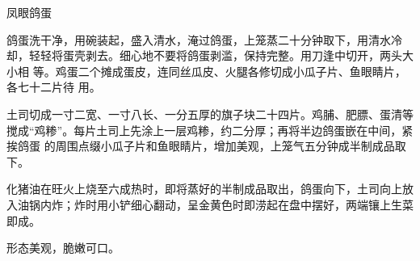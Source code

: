 \begin{recipe}{凤眼鸽蛋}

\ingredients


\preparation

\step 鸽蛋洗干净，用碗装起，盛入清水，淹过鸽蛋，上笼蒸二十分钟取下，用清水冷
却，轻轻将蛋壳剥去。细心地不要将鸽蛋剥滥，保持完整。用刀逢中切开，两头大小相
等。鸡蛋二个摊成蛋皮，连同丝瓜皮、火腿各修切成小瓜子片、鱼眼睛片，各七十二片待
用。

\step 土司切成一寸二宽、一寸八长、一分五厚的旗子块二十四片。鸡脯、肥膘、蛋清等
搅成“鸡糁”。每片土司上先涂上一层鸡糁，约二分厚；再将半边鸽蛋嵌在中间，紧挨鸽蛋
的周围点缀小瓜子片和鱼眼睛片，增加美观，上笼气五分钟成半制成品取下。

\step 化猪油在旺火上烧至六成热时，即将蒸好的半制成品取出，鸽蛋向下，土司向上放
入油锅内炸；炸时用小铲细心翻动，呈金黄色时即涝起在盘中摆好，两端镶上生菜即成。

\features

形态美观，脆嫩可口。

\end{recipe}

